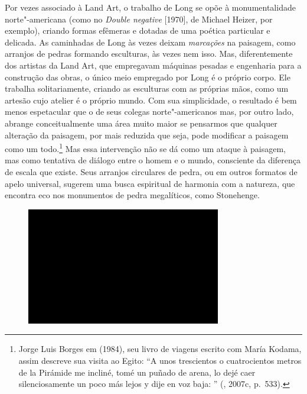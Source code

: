 Por vezes associado à Land Art, o trabalho de Long se opõe à
monumentalidade norte"-americana (como no \emph{Double negative}
{[}1970{]}, de Michael Heizer, por exemplo), criando formas efêmeras e
dotadas de uma poética particular e delicada. As caminhadas de Long às
vezes deixam \emph{marcações} na paisagem, como arranjos de pedras
formando esculturas, às vezes nem isso. Mas, diferentemente dos artistas
da Land Art, que empregavam máquinas pesadas e engenharia para a
construção das obras, o único meio empregado por Long é o próprio corpo.
Ele trabalha solitariamente, criando as esculturas com as próprias mãos,
como um artesão cujo atelier é o próprio mundo. Com sua simplicidade, o
resultado é bem menos espetacular que o de seus colegas norte"-americanos
mas, por outro lado, abrange conceitualmente uma área muito maior se
pensarmos que qualquer alteração da paisagem, por mais reduzida que
seja, pode modificar a paisagem como um todo.\footnote{Jorge Luis Borges
  em {} (1984), seu livro de viagens escrito com María Kodama,
  assim descreve sua visita ao Egito: ``A unos trescientos o
  cuatrocientos metros de la Pirámide me incliné, tomé un puñado de
  arena, lo dejé caer silenciosamente un poco más lejos y dije en voz
  baja: {}'' (, 2007c, p.~533).}
Mas essa intervenção não se dá como um ataque à paisagem, mas como
tentativa de diálogo entre o homem e o mundo, consciente da diferença de
escala que existe. Seus arranjos circulares de pedra, ou em outros
formatos de apelo universal, sugerem uma busca espiritual de harmonia
com a natureza, que encontra eco nos monumentos de pedra megalíticos,
como Stonehenge.

\begin{figure}[!ht]

\centering
 \includegraphics[width=85mm]{./imgs/im1.jpg}
\caption{\tiny{}}

\end{figure}

